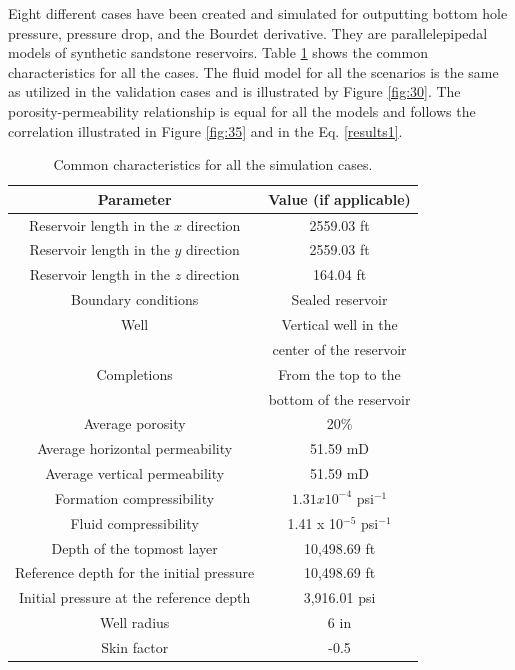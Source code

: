 Eight different cases have been created and simulated for outputting bottom hole pressure, pressure drop, and the Bourdet derivative. They are parallelepipedal models of synthetic sandstone reservoirs. Table \ref{table10.1} shows the common characteristics for all the cases. The fluid model for all the scenarios is the same as utilized in the validation cases and is illustrated by Figure \ref{fig:30}. The porosity-permeability relationship is equal for all the models and follows the correlation illustrated in Figure \ref{fig:35} and in the Eq. \ref{results1}.
\begin{table}[htbp]
	\centering
	\caption{Common characteristics for all the simulation cases.}
	\begin{tabular}{c c}
	\toprule
	Parameter & Value (if applicable)\\
	\midrule
	Reservoir length in the $x$ direction & 2559.03 ft\\
	Reservoir length in the $y$ direction & 2559.03 ft\\
	Reservoir length in the $z$ direction & 164.04 ft\\
	Boundary conditions & Sealed reservoir \\
	Well & Vertical well in the\\
	& center of the reservoir\\
	Completions & From the top to the\\
	& bottom of the reservoir\\
	Average porosity & 20\%\\
	Average horizontal permeability & 51.59 mD\\
	Average vertical permeability & 51.59 mD\\
	Formation compressibility & $1.31 x 10^{-4}$ psi$^{-1}$\\
	Fluid compressibility &  1.41 x 10$^{-5}$ psi$^{-1}$\\
	Depth of the topmost layer & 10,498.69 ft\\
	Reference depth for the initial pressure & 10,498.69 ft\\
	Initial pressure at the reference depth & 3,916.01 psi\\
	Well radius & 6 in\\
	Skin factor & -0.5\\
	\bottomrule
\end{tabular}
	\label{table10.1}
\end{table}
